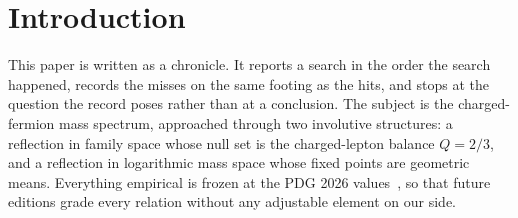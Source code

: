\documentclass[aps,twocolumn,superscriptaddress,nofootinbib,floatfix]{revtex4-2}
\begin{document}
\begin{abstract}
pre-theoretical patterns with declared provenance, in the sense of companion work proposing explicit criteria for distinguishing structure from coincidence~\cite{BrilliantPattern}; they are offered for tracking and falsification, not claimed as physics.
\end{abstract}

\maketitle

\section{Introduction}
\label{sec:intro}

This paper is written as a chronicle. It reports a search in the order the search happened, records the misses on the same footing as the hits, and stops at the question the record poses rather than at a conclusion. The subject is the charged-fermion mass spectrum, approached through two involutive structures: a reflection in family space whose null set is the charged-lepton balance $Q=2/3$, and a reflection in logarithmic mass space whose fixed points are geometric means. Everything empirical is frozen at the PDG 2026 values~\cite{PDG2026}, so that future editions grade every relation without any adjustable element on our side.
\end{document}
